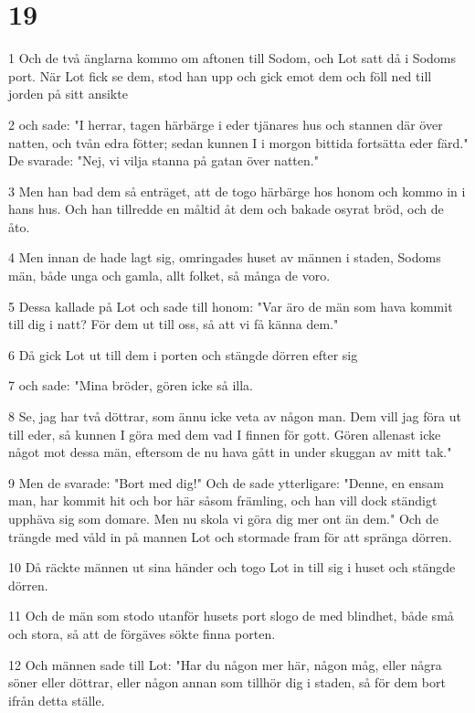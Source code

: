 \chapter{19}

\par 1 Och de två änglarna kommo om aftonen till Sodom, och Lot satt då i Sodoms port. När Lot fick se dem, stod han upp och gick emot dem och föll ned till jorden på sitt ansikte
\par 2 och sade: "I herrar, tagen härbärge i eder tjänares hus och stannen där över natten, och tvån edra fötter; sedan kunnen I i morgon bittida fortsätta eder färd." De svarade: "Nej, vi vilja stanna på gatan över natten."
\par 3 Men han bad dem så enträget, att de togo härbärge hos honom och kommo in i hans hus. Och han tillredde en måltid åt dem och bakade osyrat bröd, och de åto.
\par 4 Men innan de hade lagt sig, omringades huset av männen i staden, Sodoms män, både unga och gamla, allt folket, så många de voro.
\par 5 Dessa kallade på Lot och sade till honom: "Var äro de män som hava kommit till dig i natt? För dem ut till oss, så att vi få känna dem."
\par 6 Då gick Lot ut till dem i porten och stängde dörren efter sig
\par 7 och sade: "Mina bröder, gören icke så illa.
\par 8 Se, jag har två döttrar, som ännu icke veta av någon man. Dem vill jag föra ut till eder, så kunnen I göra med dem vad I finnen för gott. Gören allenast icke något mot dessa män, eftersom de nu hava gått in under skuggan av mitt tak."
\par 9 Men de svarade: "Bort med dig!" Och de sade ytterligare: "Denne, en ensam man, har kommit hit och bor här såsom främling, och han vill dock ständigt upphäva sig som domare. Men nu skola vi göra dig mer ont än dem." Och de trängde med våld in på mannen Lot och stormade fram för att spränga dörren.
\par 10 Då räckte männen ut sina händer och togo Lot in till sig i huset och stängde dörren.
\par 11 Och de män som stodo utanför husets port slogo de med blindhet, både små och stora, så att de förgäves sökte finna porten.
\par 12 Och männen sade till Lot: "Har du någon mer här, någon måg, eller några söner eller döttrar, eller någon annan som tillhör dig i staden, så för dem bort ifrån detta ställe.
